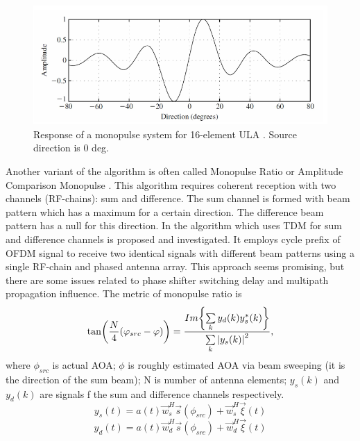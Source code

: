 \begin{figure}[h]
    \centering
    \includegraphics[width=\linewidth]{figs/fig3.11}
    \caption{Response of a monopulse system for 16-element ULA \cite{Tuncer2009}. Source
    direction is 0 deg.}
    \label{fig:3.11}
\end{figure}
Another variant of the algorithm is often called Monopulse Ratio or Amplitude
Comparison Monopulse \cite{Mosca1969}. This algorithm requires coherent reception with two
channels (RF-chains): sum and difference. The sum channel is formed with beam
pattern which has a maximum for a certain direction. The difference beam
pattern has a null for this direction. In \cite{Kim2018} the algorithm which uses TDM for
sum and difference channels is proposed and investigated. It employs cycle
prefix of OFDM signal to receive two identical signals with different beam
patterns using a single RF-chain and phased antenna array. This approach seems
promising, but there are some issues related to phase shifter switching delay
and multipath propagation influence.
The metric of monopulse ratio is \cite{Kim2018}
\begin{equation}
    \label{eq:}
    \tan(\frac{N}{4}(\varphi_{src} - \varphi)) = 
    \frac{Im\qty{\sum\limits_{k} y_d(k) y_s^*(k)}}{\sum\limits_{k}
    \abs{y_s(k)}^2},
\end{equation}
where $\phi_{src}$ is actual  AOA;  $\phi$ is roughly estimated AOA via beam
sweeping (it is the direction of the sum beam); N is number of antenna
elements; $y_s(k)$ and  $y_d(k)$ are signals f the sum and difference channels
respectively.
 \begin{equation}
    \label{eq:}
    y_s(t) = a(t) \vec w_s^H \vec s(\phi_{src}) + \vec w_s^H \vec \xi(t)
\end{equation}
 \begin{equation}
    \label{eq:}
    y_d(t) = a(t) \vec w_d^H \vec s(\phi_{src}) + \vec w_d^H \vec \xi(t)
\end{equation}

